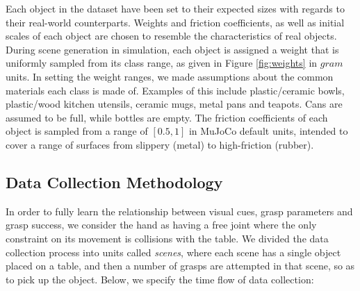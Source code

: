 Each object in the dataset have been set to their expected sizes with regards to their real-world counterparts. Weights and friction coefficients, as well as initial scales of each object  are chosen to resemble the characteristics of real objects. During scene generation in simulation, each object is assigned a weight that is uniformly sampled from its class range, as given in Figure \ref{fig:weights} in $gram$ units. In setting the weight ranges, we made assumptions about the common materials each class is made of. Examples of this include plastic/ceramic bowls, plastic/wood kitchen utensils, ceramic mugs, metal pans and teapots. Cans are assumed to be full, while bottles are empty. The friction coefficients of each object is sampled from a range of $[0.5, 1]$ in MuJoCo default units, intended to cover a range of surfaces from slippery (metal) to high-friction (rubber).

\begin{table}[]
\centering
\caption{Weight ranges for each object class. }
\label{fig:weights}
\end{table}



\subsection{Data Collection Methodology}
\label{subsection:dataCollection}

In order to fully learn the relationship between visual cues, grasp parameters and grasp success, we  consider the hand as having a free joint where the only constraint on its movement is collisions with the table. We divided the data collection process into units called \textit{scenes}, where each scene has a single object placed on a table, and then a number of grasps are attempted in that scene, so as to pick up the object. Below, we specify the time flow of data collection:

